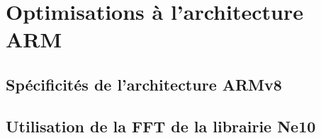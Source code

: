 \documentclass{article}
\begin{document}






    \section{Optimisations à l'architecture ARM}
    \subsection{Spécificités de l'architecture ARMv8}
    \subsection{Utilisation de la FFT de la librairie Ne10}
\end{document}

